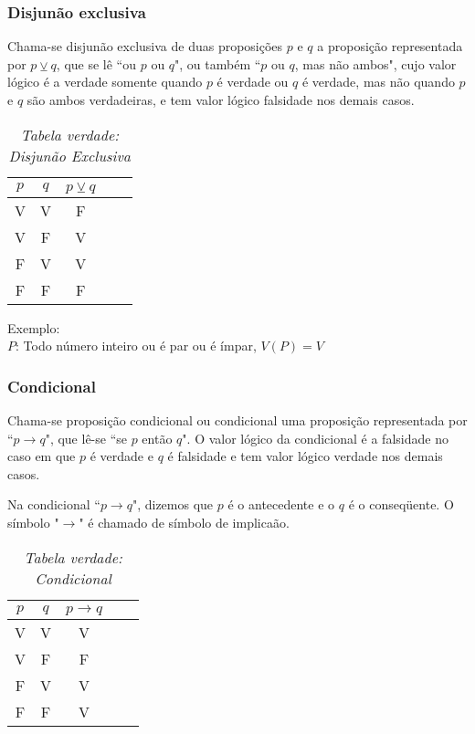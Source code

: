 \subsubsection{Disjunão exclusiva}
\begin{definicao} Chama-se disjunão exclusiva de duas proposições $p$ e $q$ a proposição representada por $p\veebar q$, que se lê ``ou $p$ ou $q$", ou também ``$p$ ou $q$, mas não ambos", cujo valor lógico é a verdade somente quando $p$ é verdade ou $q$ é verdade, mas não quando $p$ e $q$ são ambos verdadeiras, e tem valor lógico falsidade nos demais casos.\end{definicao}
\begin{table}[h]
   \centering
   \setlength{\arrayrulewidth}{0,5\arrayrulewidth}
   \caption{\it Tabela verdade: Disjunão Exclusiva}
   \begin{tabular}{|c|c|c|c|c|}
      \hline
      $p$ & $q$ & $p\veebar q$ \\
     \hline
      V & V & F \\
      \hline
      V & F & V \\
      \hline
      F & V & V \\
      \hline
      F & F & F \\
      \hline
   \end{tabular}
\end{table}

Exemplo:\\
\textbf{$P$}: Todo número inteiro ou é par ou é ímpar, $V(P)=V$

\subsubsection{Condicional}
\begin{definicao}[Condicional] Chama-se proposição condicional ou condicional uma proposição representada por ``$p\rightarrow q$", que lê-se ``se $p$ então $q$". O valor lógico da condicional é a falsidade no caso em que $p$ é verdade e $q$ é falsidade e tem valor lógico verdade nos demais casos.\end{definicao}

Na condicional ``$p\rightarrow q$", dizemos que $p$ é o antecedente e o $q$ é o conseqüente. O símbolo "$\rightarrow$" é chamado de símbolo de implicaão.
\begin{table}[h]
   \centering
   \setlength{\arrayrulewidth}{0,5\arrayrulewidth}
   \caption{\it Tabela verdade: Condicional}
   \begin{tabular}{|c|c|c|c|c|}
      \hline
      $p$ & $q$ & $p\rightarrow q$ \\
     \hline
      V & V & V \\
      \hline
      V & F & F \\
      \hline
      F & V & V \\
      \hline
      F & F & V \\
      \hline
   \end{tabular}
\end{table}

